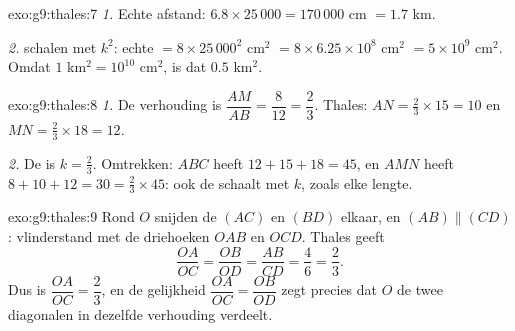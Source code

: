 \begin{solution}{exo:g9:thales:7}
\emph{1.} Echte afstand: $6.8 \times 25\,000 = 170\,000$ cm $= 1.7$ km.

\emph{2.}  schalen met $k^2$: echte 
$= 8 \times 25\,000^2$ cm$^2$ $= 8 \times 6.25 \times 10^8$ cm$^2$
$= 5 \times 10^9$ cm$^2$. Omdat $1$ km$^2 = 10^{10}$ cm$^2$, is dat $0.5$ km$^2$.
\end{solution}

\begin{solution}{exo:g9:thales:8}
\emph{1.} De verhouding is $\dfrac{AM}{AB} = \dfrac{8}{12} = \dfrac23$. Thales:
$AN = \frac23 \times 15 = 10$ en $MN = \frac23 \times 18 = 12$.

\emph{2.} De  is $k = \frac23$. Omtrekken: $ABC$ heeft
$12 + 15 + 18 = 45$, en $AMN$ heeft $8 + 10 + 12 = 30 = \frac23 \times 45$: ook de
 schaalt met $k$, zoals elke lengte.
\end{solution}

\begin{solution}{exo:g9:thales:9}
Rond $O$ snijden de  $(AC)$ en $(BD)$ elkaar, en $(AB) \parallel (CD)$:
vlinderstand met de driehoeken $OAB$ en $OCD$. Thales geeft
\[
\frac{OA}{OC} = \frac{OB}{OD} = \frac{AB}{CD} = \frac46 = \frac23 .
\]
Dus is $\dfrac{OA}{OC} = \dfrac23$, en de gelijkheid
$\dfrac{OA}{OC} = \dfrac{OB}{OD}$ zegt precies dat $O$ de twee diagonalen in
dezelfde verhouding verdeelt.
\end{solution}

